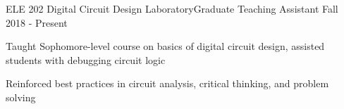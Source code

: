 \graduateheader
\begin{cvprojectentries}
  {ELE 202 {\cdotp} Digital Circuit Design Laboratory}{Graduate Teaching Assistant}
  {Fall 2018 - Present}
  {
    \begin{cvitems}
        \item{Taught Sophomore-level course on basics of digital circuit design, assisted students with debugging circuit logic}
        \item{Reinforced best practices in circuit analysis, critical thinking, and problem solving}
    \end{cvitems}
  }
\end{cvprojectentries}
